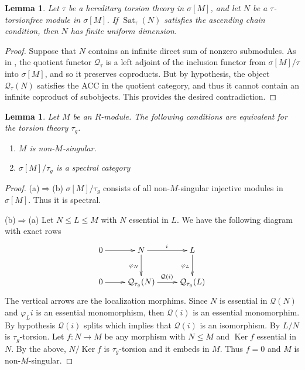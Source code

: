 \documentclass{amsart}
\newtheorem{lemma}[thm]{Lemma}
\theoremstyle{definition}
\theoremstyle{remark}
\numberwithin{equation}{section}
\DeclareMathOperator{\Ker}{Ker}
\DeclareMathOperator{\Sat}{Sat}
\newcommand{\sm}{\sigma[M]}
\begin{document}
	\begin{lemma}\label{sataccudim}
		Let $\tau$ be a hereditary torsion theory in $\sm$, 
		and let $N$ be a $\tau$-torsionfree module in $\sm$. 
		If $\Sat_\tau(N)$ satisfies the ascending chain condition, 
		then $N$ has finite uniform dimension.
	\end{lemma}
	
	\begin{proof}
		Suppose that $N$ contains an infinite direct sum of nonzero submodules.
		As in \cite[Proposition~IX.1.11]{stenstromrings},
		the quotient functor $\mathcal{Q}_{\tau}$ 
		is a left adjoint of the inclusion functor
		from $\sm/\tau$ into $\sm$,
		and so it preserves coproducts.
		But by hypothesis, 
		the object $\mathcal{Q}_{\tau} (N)$ satisfies the ACC 
		in the quotient category,
		and thus it cannot contain an infinite coproduct of subobjects.
		This provides the desired contradiction.
	\end{proof}

	\begin{lemma}\label{specnonms}
		Let $M$ be an $R$-module. The following conditions are equivalent for the torsion theory $\tau_g$.
		\begin{enumerate}[label=\emph{(\alph*)}]
			\item $M$ is non-$M$-singular.
			\item $\sm/\tau_g$ is a spectral category
		\end{enumerate}
	\end{lemma}
	
	\begin{proof}
		(a)$\Rightarrow$(b) $\sm/\tau_g$ consists of all non-$M$-singular injective modules in $\sm$. Thus it is spectral.
		
		(b)$\Rightarrow$(a) Let $N\leq L\leq M$ with $N$ essential in $L$. We have the following diagram with exact rows
		\[\xymatrix{0\ar[r] & N\ar[r]^i\ar[d]_{\varphi_N} & L\ar[d]_{\varphi_L} \\ 
			0\ar[r] & \mathcal{Q}_{\tau_g}(N)\ar[r]^{\mathcal{Q}(i)} & \mathcal{Q}_{\tau_g}(L) }\]
		The vertical arrows are the localization morphims. Since $N$ is essential in $\mathcal{Q}(N)$ and $\varphi_Li$ is an essential monomorphism, then $\mathcal{Q}(i)$ is an essential monomorphim. By hypothesis $\mathcal{Q}(i)$ splits which implies that $\mathcal{Q}(i)$ is an isomorphism. By \cite[9.18]{wisbauermodules} $L/N$ is $\tau_g$-torsion. Let $f:N\to M$ be any morphism with $N\leq M$ and $\Ker f$ essential in $N$. By the above, $N/\Ker f$ is $\tau_g$-torsion and it embeds in $M$. Thus $f=0$ and $M$ is non-$M$-singular.
	\end{proof}
\end{document}
